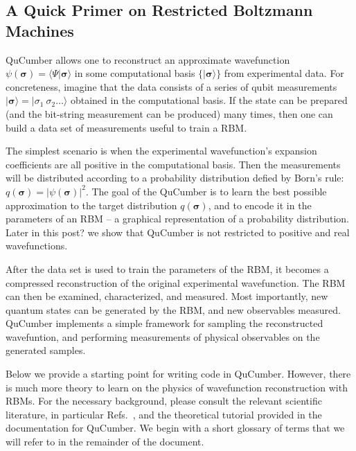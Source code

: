 \documentclass[submission, Phys]{SciPost}
\begin{document}
\subsection{A Quick Primer on Restricted Boltzmann Machines}

QuCumber allows one to reconstruct an approximate wavefunction $\psi( \boldsymbol{\sigma} )  = \langle \Psi \vert \boldsymbol{\sigma} \rangle$ in some computational basis $\{ \vert \boldsymbol{ \sigma} \rangle \}$ from experimental data.   For concreteness, imagine that the data consists of a series of qubit measurements $\vert {\boldsymbol{ \sigma}} \rangle = \vert { \sigma}_1~{ \sigma}_2 \dots \rangle$ obtained in the computational basis. If the state can be prepared (and the bit-string measurement can be produced) many times, then one can build a data set of measurements useful to train a RBM.

The simplest scenario is when the experimental wavefunction's expansion coefficients are all positive in the computational basis.  
Then the measurements will be distributed according to a probability distribution defied by Born's rule: $q(\boldsymbol{\sigma}) = | \psi( \boldsymbol{\sigma} ) |^2$.
The goal of the QuCumber is to learn the best possible approximation to the target distribution $q(\boldsymbol{\sigma})$, and to encode it in the parameters of an RBM -- a graphical representation of a probability distribution. Later in this post? we show that QuCumber is not restricted to positive and real wavefunctions.

After the data set is used to train the parameters of the RBM, it becomes a compressed reconstruction of the original experimental wavefunction.  The RBM can then be examined, characterized, and measured.  Most importantly, new quantum states can be generated by the RBM, and new observables measured.  QuCumber implements a simple framework for sampling the reconstructed wavefuntion, and performing measurements of physical observables on the generated samples.

Below we provide a starting point for writing code in QuCumber.  However, there is much more theory to learn on the physics of wavefunction reconstruction with RBMs. For the necessary background, please consult the relevant scientific literature, in particular Refs.~\cite{Torlai2016thermo, torlai2018tomography, CarleoTroyer2017Science}, and the theoretical tutorial provided in the documentation for QuCumber.  We begin with a short glossary of terms that we will refer to in the remainder of the document.
\end{document}
